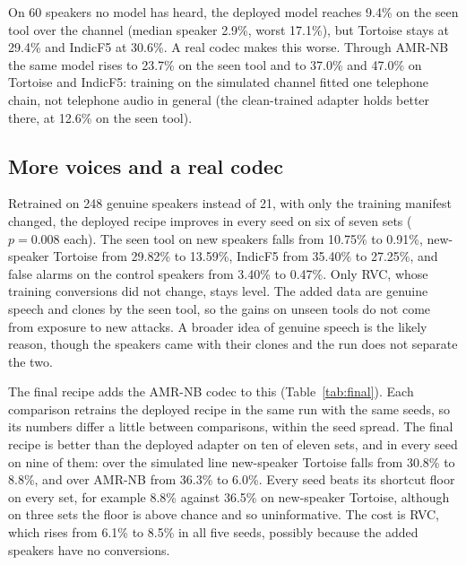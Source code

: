 \documentclass[conference]{IEEEtran}
\begin{document}
On 60 speakers no model has heard, the deployed model reaches 9.4\% on the seen tool over
the channel (median speaker 2.9\%, worst 17.1\%), but Tortoise stays at 29.4\% and IndicF5
at 30.6\%. A real codec makes this worse. Through AMR-NB the same model rises to 23.7\% on
the seen tool and to 37.0\% and 47.0\% on Tortoise and IndicF5: training on the simulated
channel fitted one telephone chain, not telephone audio in general (the clean-trained
adapter holds better there, at 12.6\% on the seen tool).

\subsection{More voices and a real codec}

Retrained on 248 genuine speakers instead of 21, with only the training manifest changed,
the deployed recipe improves in every seed on six of seven sets ($p = 0.008$ each). The
seen tool on new speakers falls from 10.75\% to 0.91\%, new-speaker Tortoise from 29.82\%
to 13.59\%, IndicF5 from 35.40\% to 27.25\%, and false alarms on the control speakers from
3.40\% to 0.47\%. Only RVC, whose training conversions did not change, stays level. The
added data are genuine speech and clones by the seen tool, so the gains on unseen tools do
not come from exposure to new attacks. A broader idea of genuine speech is the likely
reason, though the speakers came with their clones and the run does not separate the two.

The final recipe adds the AMR-NB codec to this (Table~\ref{tab:final}). Each comparison
retrains the deployed recipe in the same run with the same seeds, so its numbers differ a
little between comparisons, within the seed spread. The final recipe is better than
the deployed adapter on ten of eleven sets, and in every seed on nine of them: over the
simulated line new-speaker Tortoise falls from 30.8\% to 8.8\%, and over AMR-NB from
36.3\% to 6.0\%. Every seed beats its shortcut floor on every set, for example 8.8\%
against 36.5\% on new-speaker Tortoise, although on three sets the floor is above chance
and so uninformative. The cost is RVC, which rises from 6.1\% to 8.5\% in all five seeds,
possibly because the added speakers have no conversions.
\end{document}
